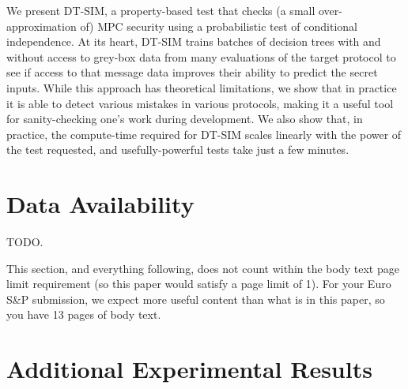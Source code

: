 \documentclass[compsoc, conference, a4paper, 10pt, times]{IEEEtran}
\newcommand{\toolname}{\textsc{DT-SIM}\xspace}
\begin{document}
We present \toolname,
a property-based test that checks (a small over-approximation of) MPC security
using a probabilistic test of conditional independence.
At its heart, \toolname trains batches of decision trees with and without access to grey-box data from many evaluations of the target protocol
to see if access to that message data improves their ability to predict the secret inputs.
While this approach has theoretical limitations, we show that in practice it is able to detect various mistakes in various protocols,
making it a useful tool for sanity-checking one's work during development.
We also show that, in practice, the compute-time required for \toolname scales linearly with the power of the test requested,
and usefully-powerful tests take just a few minutes.



\section*{Data Availability}\label{sec:public-repo}

TODO.

This section, and everything following, does not count within the body text page limit requirement (so this paper would satisfy a page limit of 1). For your Euro S\&P submission, we expect more useful content than what is in this paper, so you have 13 pages of body text.





\appendices

\section{Additional Experimental Results}
\label{sec:addit-exper-results}




\end{document}
